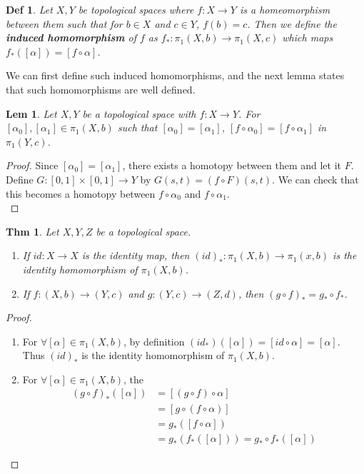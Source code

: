 \documentclass[paper=a4, fontsize=11pt]{scrartcl}
\newtheorem{theorem}{Thm}
\newtheorem{definition}{Def}
\newtheorem{lemma}{Lem}
\begin{document}
\begin{definition}
 Let $X,Y$ be topological spaces where $f:X\to Y$ is a homeomorphism between them such that for $b \in X$ and $c \in Y$, $f(b)=c$. Then we define the \textbf{induced homomorphism} of $f$ as $f_* : \pi_1(X,b) \to \pi_1(X,c)$ which maps $f_*([\alpha])=[f \circ \alpha]$.\\
\end{definition}

We can first define such induced homomorphisms, and the next lemma states that such homomorphisms are well defined.\\

\begin{lemma}
	Let $X,Y$ be a topological space with $f:X\to Y$. For $[\alpha_0],[\alpha_1]\in\pi_1(X,b)$ such that $[\alpha_0]=[\alpha_1]$,  $[f \circ \alpha_0]=[f\circ \alpha_1]$ in $\pi_1(Y,c)$.\\	
\end{lemma}

\begin{proof}
	Since $[\alpha_0]=[\alpha_1]$, there exists a homotopy between them and let it $F$. Define $G:[0,1]\times[0,1]\to Y$ by $G(s,t)=(f \circ F)(s,t)$. We can check that this becomes a homotopy between $f \circ \alpha_0$ and $f \circ \alpha_1$. \\
\end{proof}

\begin{theorem}
	Let $X,Y,Z$ be a topological space.
	\begin{enumerate}
		\item If $id : X \to X$ is the identity map, then $(id)_* : \pi_1(X,b) \to \pi_1(x,b)$ is the identity homomorphism of $\pi_1(X,b)$.
		\item If $f:(X,b)\to(Y,c)$ and $g:(Y,c)\to(Z,d)$, then $(g \circ f)_* = g_* \circ f_*$.\\
	\end{enumerate}
\end{theorem}

\begin{proof}
$ $ \newline
\vspace{-0.15in}
	\begin{enumerate}[label=\arabic*)]
		\item For $\forall [\alpha] \in \pi_1(X,b)$, by definition $(id_*)([\alpha])=[id \circ \alpha]=[\alpha]$. Thus $(id)_*$ is the identity homomorphism of $\pi_1(X,b)$.
		\item For $\forall [\alpha] \in \pi_1(X,b)$, the 
		\begin{equation}\nonumber
			\begin{split}
				(g \circ f)_* ([\alpha]) &= [(g \circ f) \circ \alpha]\\
				&= [g \circ (f \circ \alpha)] \\
				&= g_* ([f \circ \alpha]) \\
				&= g_* (f_* ([\alpha])) =  g_* \circ f_* ([\alpha])
			\end{split}
		\end{equation}
	\end{enumerate}
\end{proof}
\end{document}

